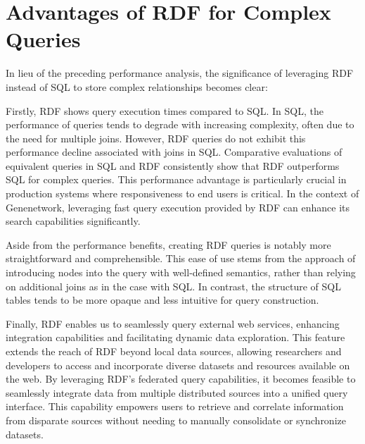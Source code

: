\section{Advantages of RDF for Complex Queries}

In lieu of the preceding performance analysis, the significance of leveraging RDF instead of SQL to store complex relationships becomes clear:

Firstly, RDF shows query execution times compared to SQL. In SQL, the performance of queries tends to degrade with increasing complexity, often due to the need for multiple joins. However, RDF queries do not exhibit this performance decline associated with joins in SQL. Comparative evaluations of equivalent queries in SQL and RDF consistently show that RDF outperforms SQL for complex queries. This performance advantage is particularly crucial in production systems where responsiveness to end users is critical. In the context of Genenetwork, leveraging fast query execution provided by RDF can enhance its search capabilities significantly.

Aside from the performance benefits, creating RDF queries is notably more straightforward and comprehensible. This ease of use stems from the approach of introducing nodes into the query with well-defined semantics, rather than relying on additional joins as in the case with SQL.  In contrast, the structure of SQL tables tends to be more opaque and less intuitive for query construction.


Finally, RDF enables us to seamlessly query external web services, enhancing integration capabilities and facilitating dynamic data exploration. This feature extends the reach of RDF beyond local data sources, allowing researchers and developers to access and incorporate diverse datasets and resources available on the web. By leveraging RDF's federated query capabilities, it becomes feasible to seamlessly integrate data from multiple distributed sources into a unified query interface. This capability empowers users to retrieve and correlate information from disparate sources without needing to manually consolidate or synchronize datasets.


